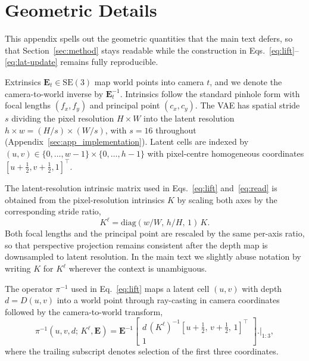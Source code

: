 
\section{Geometric Details}
\label{sec:app_geometry}

This appendix spells out the geometric quantities that the main text defers, so that Section~\ref{sec:method} stays readable while the construction in Eqs.~\ref{eq:lift}--\ref{eq:lat-update} remains fully reproducible.

Extrinsics $\mathbf{E}_t \in \mathrm{SE}(3)$ map world points into camera $t$, and we denote the camera-to-world inverse by $\mathbf{E}_t^{-1}$.
Intrinsics follow the standard pinhole form with focal lengths $(f_x, f_y)$ and principal point $(c_x, c_y)$.
The VAE has spatial stride $s$ dividing the pixel resolution $H \times W$ into the latent resolution $h \times w = (H/s) \times (W/s)$, with $s = 16$ throughout (Appendix~\ref{sec:app_implementation}).
Latent cells are indexed by $(u, v) \in \{0, \dots, w-1\} \times \{0, \dots, h-1\}$ with pixel-centre homogeneous coordinates $[u + \tfrac{1}{2}, v + \tfrac{1}{2}, 1]^\top$.

The latent-resolution intrinsic matrix used in Eqs.~\ref{eq:lift} and~\ref{eq:read} is obtained from the pixel-resolution intrinsics $K$ by scaling both axes by the corresponding stride ratio,
\begin{equation}
K^{\ell} = \mathrm{diag}(w/W,\, h/H,\, 1)\, K.
\end{equation}
Both focal lengths and the principal point are rescaled by the same per-axis ratio, so that perspective projection remains consistent after the depth map is downsampled to latent resolution.
In the main text we slightly abuse notation by writing $K$ for $K^{\ell}$ wherever the context is unambiguous.

The operator $\pi^{-1}$ used in Eq.~\ref{eq:lift} maps a latent cell $(u, v)$ with depth $d = D(u, v)$ into a world point through ray-casting in camera coordinates followed by the camera-to-world transform,
\begin{equation}
\pi^{-1}(u, v, d;\, K^{\ell}, \mathbf{E}) = \mathbf{E}^{-1}\!\begin{bmatrix} d\,(K^{\ell})^{-1} [u + \tfrac{1}{2},\, v + \tfrac{1}{2},\, 1]^\top \\ 1 \end{bmatrix}\Biggl.\Biggr|_{1:3},
\end{equation}
where the trailing subscript denotes selection of the first three coordinates.

